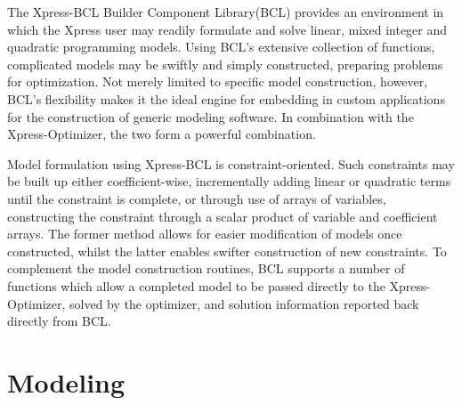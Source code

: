 \documentclass[a4paper, 12pt]{article}
\begin{document}
\noindent
The Xpress-BCL Builder Component Library(BCL) provides an environment in which the Xpress user may readily formulate and solve linear, mixed integer and quadratic programming models. Using BCL’s extensive collection of functions, complicated models may be swiftly and simply constructed, preparing problems for optimization. Not merely limited to specific model construction, however, BCL’s flexibility makes it the ideal engine 
for embedding in custom applications for the construction of generic modeling software. In combination with the Xpress-Optimizer, the two form 
a powerful combination.\\ \par
\noindent
Model formulation using Xpress-BCL is constraint-oriented. Such constraints may be built up either coefficient-wise, incrementally adding 
linear or quadratic terms until the constraint is complete, or through use of arrays of variables, constructing the constraint through a 
scalar product of variable and coefficient arrays. The former method allows for easier modification of models once constructed, whilst the 
latter enables swifter construction of new constraints. To complement the model construction routines, BCL supports a number of functions which allow a completed model to be passed directly to the Xpress-Optimizer, solved by the optimizer, and solution information reported back 
directly from BCL.

\section{Modeling}
\end{document}
